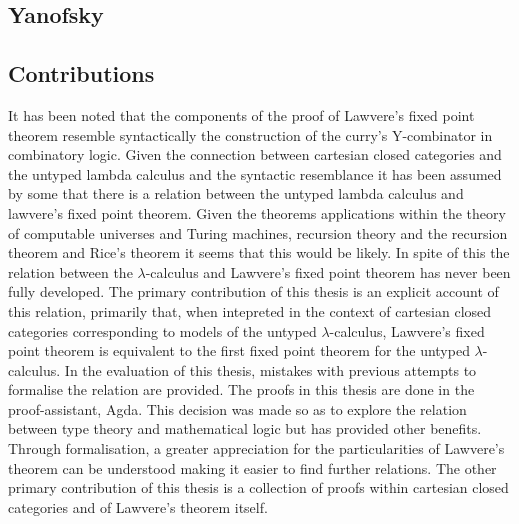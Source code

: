 
\subsection{Yanofsky}

\subsection{Contributions}
It has been noted that the components of the proof of Lawvere's fixed point
theorem resemble syntactically the construction of the curry's Y-combinator in
combinatory logic. Given the connection between cartesian closed categories and
the untyped lambda calculus and the syntactic resemblance it has been assumed by
some that there is a relation between the untyped lambda calculus and lawvere's
fixed point theorem. Given the theorems applications within the theory of
computable universes and Turing machines, recursion theory and the recursion
theorem and Rice's theorem it seems that this would be likely. In spite of this
the relation between the $\lambda$-calculus and Lawvere's fixed point theorem has
never been fully developed. The primary contribution of this thesis is an
explicit account of this relation, primarily that, when intepreted in the
context of cartesian closed categories corresponding to models of the untyped
$\lambda$-calculus, Lawvere's fixed point theorem is equivalent to the first
fixed point theorem for the untyped $\lambda$-calculus. In the evaluation of
this thesis, mistakes with previous attempts to formalise the relation are
provided. The proofs in this thesis are done in the proof-assistant, Agda. This
decision was made so as to explore the relation between type theory and
mathematical logic but has provided other benefits. Through formalisation, a
greater appreciation for the particularities of Lawvere's theorem can be
understood making it easier to find further relations. The other primary
contribution of this thesis is a collection of proofs within cartesian closed
categories and of Lawvere's theorem itself.


